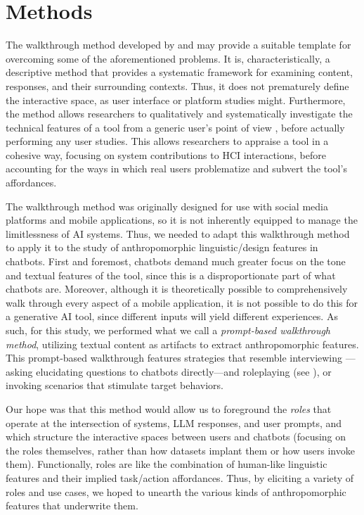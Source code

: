 \section{Methods}


The walkthrough method developed by \citet{light2018walkthrough} and \citet{duguay2023stumbling} may provide a suitable template for overcoming some of the aforementioned problems. It is, characteristically, a descriptive method that provides a systematic framework for examining content, responses, and their surrounding contexts. Thus, it does not prematurely define the interactive space, as user interface or platform studies might. Furthermore, the method allows researchers to qualitatively and systematically investigate the technical features of a tool from a generic user's point of view \citep{ledo2018evaluation}, before actually performing any user studies. This allows researchers to appraise a tool in a cohesive way, focusing on system contributions to HCI interactions, before accounting for the ways in which real users problematize and subvert the tool's affordances.

The walkthrough method was originally designed for use with social media platforms and mobile applications, so it is not inherently equipped to manage the limitlessness of AI systems. Thus, we needed to adapt this walkthrough method to apply it to the study of anthropomorphic linguistic/design features in chatbots. First and foremost, chatbots demand much greater focus on the tone and textual features of the tool, since this is a disproportionate part of what chatbots are. Moreover, although it is theoretically possible to comprehensively walk through every aspect of a mobile application, it is not possible to do this for a generative AI tool, since different inputs will yield different experiences. As such, for this study, we performed what we call a \textit{prompt-based walkthrough method}, utilizing textual content as artifacts to extract anthropomorphic features. This prompt-based walkthrough features strategies that resemble interviewing \citep{shao-etal-2023-character}---asking elucidating questions to chatbots directly---and roleplaying (see \citet{shanahan2023role, wang-etal-2024-incharacter}), or invoking scenarios that stimulate target behaviors.

Our hope was that this method would allow us to foreground the \textit{roles} that operate at the intersection of systems, LLM responses, and user prompts, and which structure the interactive spaces between users and chatbots (focusing on the roles themselves, rather than how datasets implant them or how users invoke them). Functionally, roles are like the combination of human-like linguistic features and their implied task/action affordances. Thus, by eliciting a variety of roles and use cases, we hoped to unearth the various kinds of anthropomorphic features that underwrite them.


